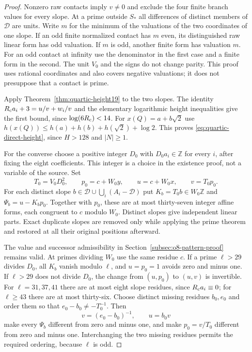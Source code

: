 \documentclass[11pt]{article}
\theoremstyle{definition}
\theoremstyle{remark}
\newcommand{\Z}{\mathbb Z}
\begin{document}
\begin{proof}
Nonzero raw contacts imply $v\ne0$ and exclude the four finite branch
values for every slope. At a prime outside $S_*$ all differences of
distinct members of $\mathcal D$ are units. Write $m$ for the minimum
of the valuations of the two coordinates of one slope. If an odd finite
normalized contact has $m$ even, its distinguished raw linear form has
odd valuation. If $m$ is odd, another finite form has valuation $m$.
For an odd contact at infinity use the denominator in the first case
and a finite form in the second. The unit $V_0$ and the signs do not
change parity. This proof uses rational coordinates and also covers
negative valuations; it does not presuppose that a contact is prime.

Apply Theorem~\ref{thm:quartic-height19} to the two slopes. The identity
$R_{\rm c}a_i+3=u/v+w_i/v$ and the elementary logarithmic height inequalities
give the first bound, since $\log(6R_{\rm c})<14$. For
$x(Q)=a+b\sqrt2$ use
$h(x(Q))\le h(a)+h(b)+h(\sqrt2)+\log2$.
This proves \eqref{eq:quartic-direct-height}, since $H>128$ and $|N|\ge1$.

For the converse choose a positive integer $D_0$ with $D_0a_i\in\Z$
for every $i$, after fixing the eight coefficients. This integer is a
choice in the existence proof, not a variable of the source. Set
\[
 T_0=V_0D_0^2,\qquad p_0=c+W_0y,\qquad
 u=c+W_0x,\qquad v=T_0p_0.
\]
For each distinct slope
$b\in\mathcal D\cup\bigcup_i(A_i-\mathcal D)$ put
$K_b=T_0b\in W_0\Z$ and $\Psi_b=u-K_bp_0$.
Together with $p_0$, these are at most thirty-seven integer affine forms,
each congruent to $c$ modulo $W_0$. Distinct slopes give independent
linear parts. Exact duplicate slopes are removed only while applying
the prime theorem and restored at all their original positions afterward.

The value and successor admissibility in
Section~\ref{subsec:o8-pattern-proof} remains valid. At primes dividing
$W_0$ use the same residue $c$. If a prime $\ell>29$ divides $D_0$,
all $K_b$ vanish modulo $\ell$, and $u=p_0=1$ avoids zero and minus one.
If $\ell>29$ does not divide $D_0$, the change from $(u,p_0)$ to $(u,v)$
is invertible. For $\ell=31,37,41$ there are at most eight slope residues,
since $R_{\rm c}a_i\equiv0$; for $\ell\ge43$ there are at most thirty-six.
Choose distinct missing residues $b_0,e_0$ and order them so that
$e_0-b_0\ne-T_0^{-1}$. Then
\[
 v=(e_0-b_0)^{-1},\qquad u=b_0v
\]
make every $\Psi_b$ different from zero and minus one, and make
$p_0=v/T_0$ different from zero and minus one. Interchanging the two
missing residues permits the required ordering, because $\ell$ is odd.


\end{proof}
\end{document}
